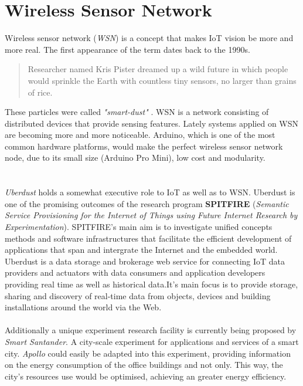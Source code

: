 \documentclass[12pt,a4paper]{report}
\begin{document}
\section{Wireless Sensor Network}
%
Wireless sensor network (\textit{WSN}) is a concept that makes IoT vision be more and more real. The first appearance of the term dates back to the 1990s.
\begin{quote}
    Researcher named Kris Pister dreamed up a wild future in which people would sprinkle the Earth with countless tiny sensors, no larger than grains of rice.
\end{quote} 
These particles were called \textit{"smart-dust"} \cite{website:smartdust}. WSN is a network consisting of distributed devices that provide sensing features. Lately systems applied on WSN are becoming more and more noticeable. Arduino, which is one of the most common hardware platforms, would make the perfect wireless sensor network node, due to its small size (Arduino Pro Mini), low cost and modularity.\\
\ \\
\ \\
\textit{Uberdust} holds a somewhat executive role to IoT as well as to WSN. Uberdust is one of the promising outcomes of the research program \textbf{SPITFIRE} (\textit{Semantic Service Provisioning for the Internet of Things using Future Internet Research by Experimentation}). SPITFIRE's main aim is to investigate unified concepts methods and software infrastructures that facilitate the efficient development of applications that span and intergrate the Internet and the embedded world. Uberdust is a data storage and brokerage web service for connecting IoT data providers and actuators with data consumers and application developers providing real time as well as historical data.It's main focus is to provide storage, sharing and discovery of real-time data from objects, devices and building installations around the world via the Web.\\
\ \\
Additionally a unique experiment research facility is currently being proposed by \textit{Smart Santander}. A city-scale experiment for applications and services of a smart city. \emph{Apollo} could easily be adapted into this experiment, providing information on the energy consumption of the office buildings and not only. This way, the city's resources use would be optimised, achieving an greater energy efficiency.\\
\ \\
%
\newpage
%
\end{document}
